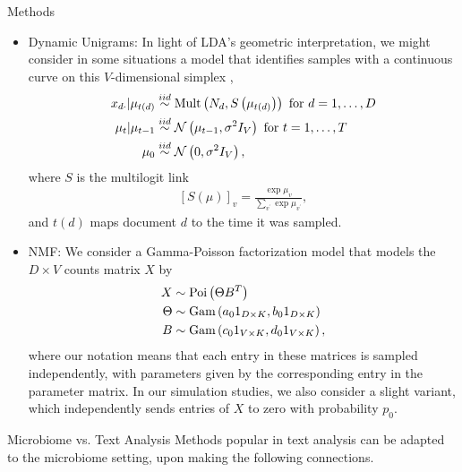 \documentclass[final, 8pt]{beamer}
\newlength{\onecolwid}
\begin{document}
\begin{frame}
\begin{columns}
\begin{column}{\onecolwid}
\begin{block}{Methods}
\begin{itemize}
\item Dynamic Unigrams: In light of LDA's geometric interpretation, we
  might consider in some situations a model that identifies samples with a
  continuous curve on this $V$-dimensional simplex \citep{blei2006dynamic},
\begin{align*}
x_{d\cdot} \vert \mu_{t\left(d\right)}  &\overset{iid}{\sim} \textnormal{Mult}\left(N_{d}, S\left(\mu_{t\left(d\right)}\right)\right) \text{ for } d = 1, \dots, D\\
\mu_{t} \vert \mu_{t - 1} &\overset{iid}{\sim} \mathcal{N}\left(\mu_{t - 1}, \sigma^{2}I_{V}\right) \text{ for } t = 1, \dots, T \\
\mu_{0} &\overset{iid}{\sim} \mathcal{N}\left(0, \sigma^{2}I_{V}\right),
\end{align*}
where $S$ is the multilogit link
\begin{align*}
\left[S\left(\mu\right)\right]_{v} = \frac{\exp{\mu_{v}}}{\sum_{v^{\prime}} \exp{\mu_{v^{\prime}}}},
\end{align*}
and $t\left(d\right)$ maps document $d$ to the time it was sampled.
\item NMF: We consider a Gamma-Poisson factorization model
  \citep{zhou2015negative} that models the $D \times V$ counts matrix $X$ by
  \begin{align*}
    X &\sim \textnormal{Poi}\left(\Theta B^{T}\right) \\
    \Theta &\sim \textnormal{Gam}\left(a_{0} 1_{D \times K}, b_{0} 1_{D \times K}\right) \\
    B &\sim \textnormal{Gam}\left(c_{0} 1_{V \times K}, d_{0} 1_{V \times K} \right),
  \end{align*}
  where our notation means that each entry in these matrices is sampled
  independently, with parameters given by the corresponding entry in the parameter
  matrix. In our simulation studies, we also consider a slight variant, which
  independently sends entries of $X$ to zero with probability $p_{0}$.
\end{itemize}
\end{block}

\begin{block}{Microbiome vs. Text Analysis}
Methods popular in text analysis can be adapted to the microbiome setting, upon
making the following connections.


\end{block}
\end{column}
\end{columns}
\end{frame}
\end{document}
